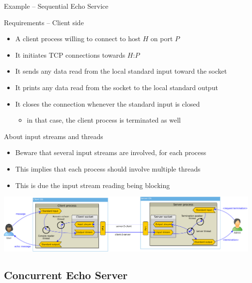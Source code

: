 \documentclass[presentation]{beamer}\mode<presentation>{\usetheme{AMSBolognaFC}}
\begin{document}
\begin{frame}[c,allowframebreaks]{Example -- Sequential Echo Service}
    \begin{block}{Requirements -- Client side}
        \begin{itemize}
            \item A client process willing to connect to host $H$ on port $P$
            \item It initiates TCP connections towards $H$:$P$
            \item It sends any data read from the local standard input toward the socket
            \item It prints any data read from the socket to the local standard output
            \item It closes the connection whenever the standard input is closed
            \begin{itemize}
                \item in that case, the client process is terminated as well
            \end{itemize}
        \end{itemize}
    \end{block}

    \begin{alertblock}{About input streams and threads}
        \begin{itemize}
            \item Beware that several input streams are involved, for each process
            \item This implies that each process should involve multiple threads
            \item This is due the input stream reading being blocking
        \end{itemize}
    \end{alertblock}

    \begin{center}
        \includegraphics[width=\linewidth]{figures/echoer.pdf}
    \end{center}

\end{frame}

\subsection{Concurrent Echo Server}
\end{document}
